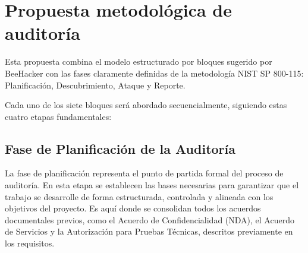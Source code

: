 \documentclass[a4paper, 11pt]{article}
\begin{document}
\clearpage

\section{Propuesta metodológica de auditoría}
\par\vspace{0.5cm}

Esta propuesta combina el modelo estructurado por bloques sugerido por BeeHacker con las fases claramente definidas de la metodología NIST SP 800-115: Planificación, Descubrimiento, Ataque y Reporte.
\par\vspace{0.5cm}

Cada uno de los siete bloques será abordado secuencialmente, siguiendo estas cuatro etapas fundamentales:

\par\vspace{0.5cm}

\subsection{Fase de Planificación de la Auditoría}
\par\vspace{0.5cm}

La fase de planificación representa el punto de partida formal del proceso de auditoría. En esta etapa se establecen las bases necesarias para garantizar que el trabajo se desarrolle de forma estructurada, controlada y alineada con los objetivos del proyecto. Es aquí donde se consolidan todos los acuerdos documentales previos, como el Acuerdo de Confidencialidad (NDA), el Acuerdo de Servicios y la Autorización para Pruebas Técnicas, descritos previamente en los requisitos.
\par\vspace{0.5cm}
\end{document}
